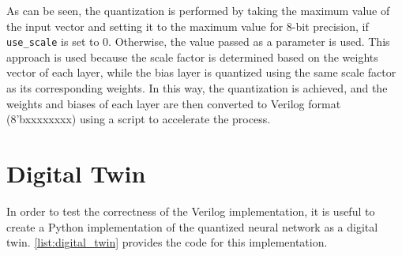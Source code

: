 \documentclass[11pt]{report}
\begin{document}
As can be seen, the quantization is performed by taking the maximum value of the input vector and setting it to the maximum value for 8-bit precision, if \texttt{use\_scale} is set to 0. Otherwise, the value passed as a parameter is used. This approach is used because the scale factor is determined based on the weights vector of each layer, while the bias layer is quantized using the same scale factor as its corresponding weights. In this way, the quantization is achieved, and the weights and biases of each layer are then converted to Verilog format (8'bxxxxxxxx) using a script to accelerate the process.

\section{Digital Twin}
\label{sec:digital_twin}

In order to test the correctness of the Verilog implementation, it is useful to create a Python implementation of the quantized neural network as a digital twin. \ref{list:digital_twin} provides the code for this implementation.
\end{document}
